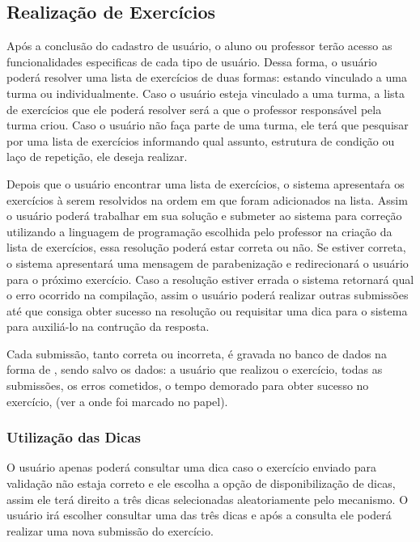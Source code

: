 \subsection{Realização de Exercícios}

Após a conclusão do cadastro de usuário, o aluno ou professor terão acesso as funcionalidades especificas de cada tipo de usuário. Dessa forma, o usuário poderá resolver uma lista de exercícios de duas formas: estando vinculado a uma turma ou individualmente. Caso o usuário esteja vinculado a uma turma, a lista de exercícios que ele poderá resolver será a que o professor responsável pela turma criou. Caso o usuário não faça parte de uma turma, ele terá que pesquisar por uma lista de exercícios informando qual assunto, estrutura de condição ou laço de repetição, ele deseja realizar. 

Depois que o usuário encontrar uma lista de exercícios, o sistema apresentaŕa os exercícios à serem resolvidos na ordem em que foram adicionados na lista. Assim o usuário poderá trabalhar em sua solução e submeter ao sistema para correção utilizando a linguagem de programação escolhida pelo professor na criação da lista de exercícios, essa resolução poderá estar correta ou não. Se estiver correta, o sistema apresentará uma mensagem de parabenização e redirecionará o usuário para o próximo exercício. Caso a resolução estiver errada o sistema retornará qual o erro ocorrido na compilação, assim o usuário poderá realizar outras submissões até que consiga obter sucesso na resolução ou requisitar uma dica para o sistema para auxiliá-lo na contrução da resposta. 

Cada submissão, tanto correta ou incorreta, é gravada no banco de dados na forma de , sendo salvo os dados: a usuário que realizou o exercício, todas as submissões, os erros cometidos, o tempo demorado para obter sucesso no exercício, (ver a onde foi marcado no papel).


\subsubsection{Utilização das Dicas}

O usuário apenas poderá consultar uma dica caso o exercício enviado para validação não estaja correto e ele escolha a opção de disponibilização de dicas, assim ele terá direito a três dicas selecionadas aleatoriamente pelo mecanismo. O usuário irá escolher consultar uma das três dicas e após a consulta ele poderá realizar uma nova submissão do exercício.

